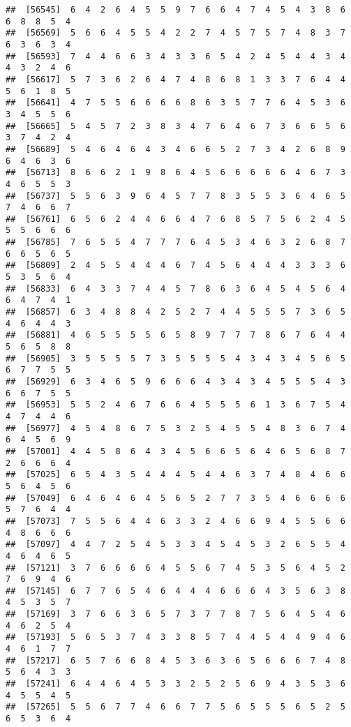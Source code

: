 \documentclass[
]{book}
\begin{document}
\begin{verbatim}
##  [56545]  6  4  2  6  4  5  5  9  7  6  6  4  7  4  5  4  3  8  6  6  8  8  5  4
##  [56569]  5  6  6  4  5  5  4  2  2  7  4  5  7  5  7  4  8  3  7  6  3  6  3  4
##  [56593]  7  4  4  6  6  3  4  3  3  6  5  4  2  4  5  4  4  3  4  4  3  2  4  6
##  [56617]  5  7  3  6  2  6  4  7  4  8  6  8  1  3  3  7  6  4  4  5  6  1  8  5
##  [56641]  4  7  5  5  6  6  6  6  8  6  3  5  7  7  6  4  5  3  6  3  4  5  5  6
##  [56665]  5  4  5  7  2  3  8  3  4  7  6  4  6  7  3  6  6  5  6  3  7  4  2  4
##  [56689]  5  4  6  4  6  4  3  4  6  6  5  2  7  3  4  2  6  8  9  6  4  6  3  6
##  [56713]  8  6  6  2  1  9  8  6  4  5  6  6  6  6  6  4  6  7  3  4  6  5  5  3
##  [56737]  5  5  6  3  9  6  4  5  7  7  8  3  5  5  3  6  4  6  5  7  4  6  6  7
##  [56761]  6  5  6  2  4  4  6  6  4  7  6  8  5  7  5  6  2  4  5  5  5  6  6  6
##  [56785]  7  6  5  5  4  7  7  7  6  4  5  3  4  6  3  2  6  8  7  6  6  5  6  5
##  [56809]  2  4  5  5  4  4  4  6  7  4  5  6  4  4  4  3  3  3  6  5  3  5  6  4
##  [56833]  6  4  3  3  7  4  4  5  7  8  6  3  6  4  5  4  5  6  4  6  4  7  4  1
##  [56857]  6  3  4  8  8  4  2  5  2  7  4  4  5  5  5  7  3  6  5  4  6  4  4  3
##  [56881]  4  6  5  5  5  5  6  5  8  9  7  7  7  8  6  7  6  4  4  5  6  5  8  8
##  [56905]  3  5  5  5  5  7  3  5  5  5  5  4  3  4  3  4  5  6  5  6  7  7  5  5
##  [56929]  6  3  4  6  5  9  6  6  6  4  3  4  3  4  5  5  5  4  3  6  6  7  5  5
##  [56953]  5  5  2  4  6  7  6  6  4  5  5  5  6  1  3  6  7  5  4  4  7  4  4  6
##  [56977]  4  5  4  8  6  7  5  3  2  5  4  5  5  4  8  3  6  7  4  6  4  5  6  9
##  [57001]  4  4  5  8  6  4  3  4  5  6  6  5  6  4  6  5  6  8  7  2  6  6  6  4
##  [57025]  6  5  4  3  5  4  4  4  5  4  4  6  3  7  4  8  4  6  6  5  6  4  5  6
##  [57049]  6  4  6  4  6  4  5  6  5  2  7  7  3  5  4  6  6  6  6  5  7  6  4  4
##  [57073]  7  5  5  6  4  4  6  3  3  2  4  6  6  9  4  5  5  6  6  4  8  6  6  6
##  [57097]  4  4  7  2  5  4  5  3  3  4  5  4  5  3  2  6  5  5  4  4  6  4  6  5
##  [57121]  3  7  6  6  6  6  4  5  5  6  7  4  5  3  5  6  4  5  2  7  6  9  4  6
##  [57145]  6  7  7  6  5  4  6  4  4  4  6  6  6  4  3  5  6  3  8  4  5  3  5  7
##  [57169]  3  7  6  6  3  6  5  7  3  7  7  8  7  5  6  4  5  4  6  4  6  2  5  4
##  [57193]  5  6  5  3  7  4  3  3  8  5  7  4  4  5  4  4  9  4  6  4  6  1  7  7
##  [57217]  6  5  7  6  6  8  4  5  3  6  3  6  5  6  6  6  7  4  8  5  6  4  3  3
##  [57241]  6  4  4  6  4  5  3  3  2  5  2  5  6  9  4  3  5  3  6  4  5  5  4  5
##  [57265]  5  5  6  7  7  4  6  6  7  7  5  6  5  5  5  6  5  2  5  6  5  3  6  4

\end{verbatim}
\end{document}
